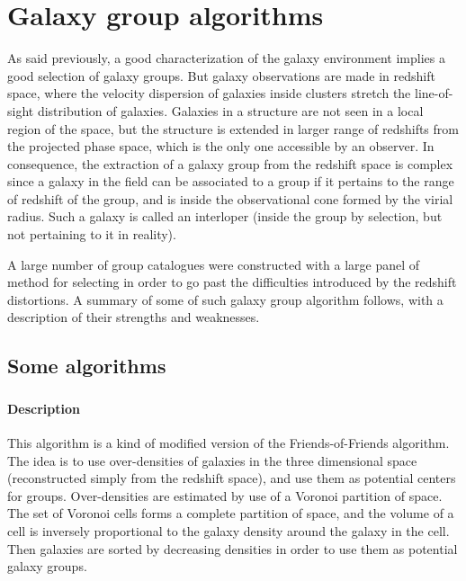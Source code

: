 \chapter{Galaxy group algorithms}
\label{cha:galaxy_group_algorithms}
\minitoc%

As said previously, a good characterization of the galaxy environment implies a
good selection of galaxy groups. But galaxy observations are made in redshift
space, where the velocity dispersion of galaxies inside clusters stretch the
line-of-sight distribution of galaxies. Galaxies in a structure are not seen in
a local region of the space, but the structure is extended in larger range of
redshifts from the projected phase space, which is the only one accessible by
an observer. In consequence, the extraction of a galaxy group from the redshift
space is complex since a galaxy in the field can be associated to a group if it
pertains to the range of redshift of the group, and is inside the observational
cone formed by the virial radius. Such a galaxy is called an interloper (inside
the group by selection, but not pertaining to it in reality). 

A large number of group catalogues were constructed with a large panel of
method for selecting in order to go past the difficulties introduced by the
redshift distortions. A summary of some of such galaxy group algorithm follows,
with a description of their strengths and weaknesses.

\section{Some algorithms}
\label{sec:some_algorithms}

\subsection{\citet{Marinoni+02}}
\label{sub:marinoni02}

\subsubsection{Description}
\label{ssub:description}

This algorithm is a kind of modified version of the Friends-of-Friends
algorithm. The idea is to use over-densities of galaxies in the three
dimensional space (reconstructed simply from the redshift space), and use them
as potential centers for groups. Over-densities are estimated by use of a
Voronoi partition of space. The set of Voronoi cells forms a complete partition
of space, and the volume of a cell is inversely proportional to the galaxy
density around the galaxy in the cell. Then galaxies are sorted by decreasing
densities in order to use them as potential galaxy groups.

